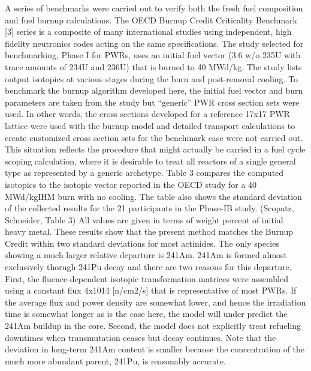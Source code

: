 A series of benchmarks were carried out to verify both the fresh fuel composition and fuel burnup calculations.  The OECD Burnup Credit Criticality Benchmark [3] series is a composite of many international studies using independent, high fidelity neutronics codes acting on the same specifications.  The study selected for benchmarking, Phase I for PWRs, uses an initial fuel vector (3.6 w/o 235U with trace amounts of 234U and 236U) that is burned to 40 MWd/kg.  The study lists output isotopics at various stages during the burn and post-removal cooling.  
To benchmark the burnup algorithm developed here, the initial fuel vector and burn parameters are taken from the study but “generic” PWR cross section sets were used.  In other words, the cross sections developed for a reference 17x17 PWR lattice were used with the burnup model and detailed transport calculations to create customized cross section sets for the benchmark case were not carried out.  This situation reflects the procedure that might actually be carried in a fuel cycle scoping calculation, where it is desirable to treat all reactors of a single general type as represented by a generic archetype.  Table 3 compares the computed isotopics to the isotopic vector reported in the OECD study for a 40 MWd/kgIHM burn with no cooling.  The table also shows the standard deviation of the collected results for the 21 participants in the Phase-IB study.  
(Scopatz, Schneider, Table 3)
All values are given in terms of weight percent of initial heavy metal.    These results show that the present method matches the Burnup Credit within two standard deviations for most actinides.  The only species showing a much larger relative departure is 241Am.  241Am is formed almost exclusively thorugh 241Pu decay and there are two reasons for this departure.  First, the fluence-dependent isotopic transformation matrices were assembled using a constant flux 4x1014 [n/cm2/s] that is representative of most PWRs.  If the average flux and power density are somewhat lower, and hence the irradiation time is somewhat longer as is the case here, the model will under predict the 241Am buildup in the core.   Second, the model does not explicitly treat refueling downtimes when transmutation ceases but decay continues. Note that the deviation in long-term 241Am content is smaller because the concentration of the much more abundant parent, 241Pu, is reasonably accurate. 
